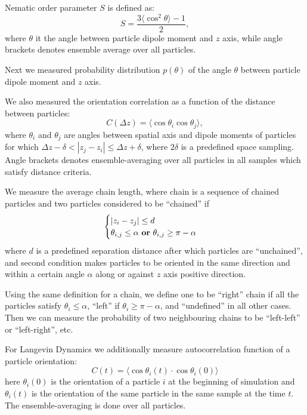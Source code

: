 Nematic order parameter $S$ is defined as:
\begin{equation}
\label{eq:nematic_order_parameter}
	S = \frac{3 \langle\cos^2 \theta\rangle - 1}{2}
	,
\end{equation}
where $\theta$ it the angle between particle dipole moment and $z$ axis, while angle brackets denotes ensemble average over all particles.

Next we measured probability distribution $p(\theta)$ of the angle $\theta$ between particle dipole moment and $z$ axis.

We also measured the orientation correlation as a function of the distance between particles:
\begin{equation}
\label{eq:distance_correlation}
	C(\Delta z) = \langle\cos \theta_i \cos \theta_j\rangle
	,
\end{equation}
where $\theta_i$ and $\theta_j$ are angles between spatial axis and dipole moments of particles for which $\Delta z - \delta < |z_j - z_i| \leq \Delta z + \delta$, where $2\delta$ is a predefined space sampling. Angle brackets denotes ensemble-averaging over all particles in all samples which satisfy distance criteria.

We measure the average chain length, where chain is a sequence of chained particles and two particles considered to be ``chained'' if 
\begin{equation}
\label{eq:chains_definition}
\begin{cases}
	|z_i - z_j| \leq d \\
	\theta_{i, j} \leq \alpha \text{ \textbf{or} } \theta_{i, j} \geq \pi - \alpha
\end{cases}
\end{equation}
where $d$ is a predefined separation distance after which particles are ``unchained'', and second condition makes particles to be oriented in the same direction and within a certain angle $\alpha$ along or against $z$ axis positive direction.

Using the same definition for a chain, we define one to be ``right'' chain if all the particles satisfy $\theta_i \leq \alpha$, ``left'' if $\theta_i \geq \pi - \alpha$, and ``undefined'' in all other cases. Then we can measure the probability of two neighbouring chains to be ``left-left'' or ``left-right'', etc.

For Langevin Dynamics we additionally measure autocorrelation function of a particle orientation:
\begin{equation}
\label{eq:autocorrelation_ld}
	C(t) = \langle\cos\theta_i(t) \cdot \cos\theta_i(0)\rangle
\end{equation}
here $\theta_i(0)$ is the orientation of a particle $i$ at the beginning of simulation and $\theta_i(t)$ is the orientation of the same particle in the same sample at the time $t$. The ensemble-averaging is done over all particles.